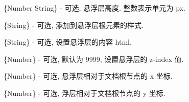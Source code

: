 \documentclass[letterpaper,10pt,english]{sphinxmanual}
\begin{document}

\begin{fulllineitems}
\label{api/component/overlay/overlay:Overlay.height}
\{Number \textbar{} String\} - 可选, 悬浮层高度. 整数表示单元为 px.

\end{fulllineitems}



\begin{fulllineitems}
\label{api/component/overlay/overlay:Overlay.elCls}
\{String\} - 可选, 添加到悬浮层根元素的样式.

\end{fulllineitems}



\begin{fulllineitems}
\label{api/component/overlay/overlay:Overlay.content}
\{String\} - 可选, 设置悬浮层的内容 html.

\end{fulllineitems}



\begin{fulllineitems}
\label{api/component/overlay/overlay:Overlay.zIndex}
\{Number\} - 可选, 默认为 9999, 设置悬浮层的 z-index 值.

\end{fulllineitems}



\begin{fulllineitems}
\label{api/component/overlay/overlay:Overlay.x}
\{Number\} - 可选, 悬浮层相对于文档根节点的 x 坐标.

\end{fulllineitems}



\begin{fulllineitems}
\label{api/component/overlay/overlay:Overlay.y}
\{Number\} - 可选, 浮层相对于文档根节点的 y 坐标.

\end{fulllineitems}
\end{document}

